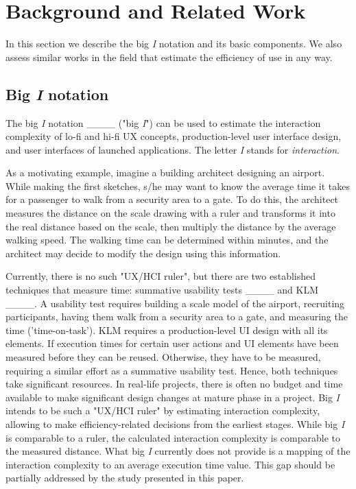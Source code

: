 \section{Background and Related Work}
\label{Sec:Background}
In this section we describe the big \textit{I} notation and its basic components. We also assess similar works in the field that estimate the efficiency of use in any way. 


\subsection{Big \textit{I} notation}
The big \textit{I} notation ____ ("big \textit{I}") can be used to estimate the interaction complexity of lo-fi and hi-fi UX concepts, production-level user interface design, and user interfaces of launched applications. The letter \textit{I} stands for \textit{interaction}. 

As a motivating example, imagine a building architect designing an airport. While making the first sketches, s/he may want to know the average time it takes for a passenger to walk from a security area to a gate. To do this, the architect measures the distance on the scale drawing with a ruler and transforms it into the real distance based on the scale, then multiply the distance by the average walking speed. The walking time can be determined within minutes, and the architect may decide to modify the design using this information.

Currently, there is no such "UX/HCI ruler", but there are two established techniques that measure time: summative usability tests ____ and KLM ____. A usability test requires building a scale model of the airport, recruiting participants, having them walk from a security area to a gate, and measuring the time ('time-on-task'). KLM requires a production-level UI design with all its elements. 
If execution times for certain user actions and UI elements have been measured before they can be reused.
Otherwise, they have to be measured, requiring a similar effort as a summative usability test. Hence, both techniques take significant resources. In real-life projects, there is often no budget and time available to make significant design changes at mature phase in a project.
Big \textit{I} intends to be such a "UX/HCI ruler" by estimating interaction complexity, allowing to make efficiency-related decisions from the earliest stages.
While big \textit{I} is comparable to a ruler, the calculated interaction complexity is comparable to the measured distance. What big \textit{I} currently does not provide is a mapping of the interaction complexity to an average execution time value. This gap should be partially addressed by the study presented in this paper.

